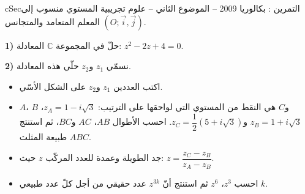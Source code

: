 \documentclass[12pt,a4paper]{article}
\newenvironment{BOX}[2]{\begin{otherlanguage}{english}\begin{arbox}{#1}{#2}}{\end{arbox}\end{otherlanguage}}
\newcounter{exo}
\newenvironment{tamrin}[1]{\stepcounter{exo}\begin{BOX}{cSec}{التمرين \theexo: #1}}{\end{BOX}}
\newenvironment{sq}{\begin{itemize}[leftmargin=2.4em,itemsep=3pt]}{\end{itemize}}
\newcommand{\qa}{\item[(أ)]}\newcommand{\qb}{\item[(ب)]}\newcommand{\qc}{\item[(جـ)]}\newcommand{\qd}{\item[(د)]}\newcommand{\qe}{\item[(هـ)]}
\begin{document}
\begin{tamrin}{بكالوريا 2009 -- الموضوع الثاني -- علوم تجريبية}
المستوي منسوب إلى المعلم المتعامد والمتجانس $(O;\vec i,\vec j)$.

\textbf{1)} حلّ في المجموعة $\mathbb{C}$ المعادلة: $z^2-2z+4=0$.

\textbf{2)} نسمّي $z_1$ و$z_2$ حلّي هذه المعادلة.
\begin{sq}
\qa اكتب العددين $z_1$ و$z_2$ على الشكل الأسّي.
\qb $A$، $B$ و$C$ هي النقط من المستوي التي لواحقها على الترتيب: $z_A=1-i\sqrt3$، $z_B=1+i\sqrt3$ و$z_C=\dfrac12\left(5+i\sqrt3\right)$.
احسب الأطوال $AB$، $AC$ و$BC$، ثم استنتج طبيعة المثلث $ABC$.
\qc جد الطويلة وعمدة للعدد المركّب $z$ حيث: $z=\dfrac{z_C-z_B}{z_A-z_B}$.
\qd احسب $z^3$، $z^6$ ثم استنتج أنّ $z^{3k}$ عدد حقيقي من أجل كلّ عدد طبيعي $k$.
\end{sq}
\end{tamrin}
\end{document}
